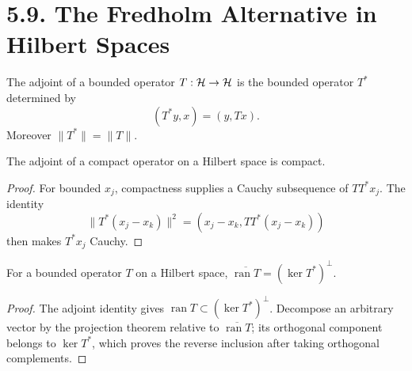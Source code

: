 \section*{5.9. The Fredholm Alternative in Hilbert Spaces}

\begin{definition}\label{gt.def5.9.adjoint-hilbert}

The adjoint of a bounded operator $T:\mathcal{H}\to\mathcal{H}$ is the bounded
operator $T^*$ determined by
\begin{equation}\label{gt.eq5.12}
(T^*y,x)=(y,Tx).
\end{equation}
Moreover $\|T^*\|=\|T\|$.
\end{definition}

\begin{lemma}\label{gt.lem5.9}

The adjoint of a compact operator on a Hilbert space is compact.
\end{lemma}
\begin{proof}
\sketch For bounded $x_j$, compactness supplies a Cauchy subsequence of
$TT^*x_j$. The identity
\[
\|T^*(x_j-x_k)\|^2=(x_j-x_k,TT^*(x_j-x_k))
\]
then makes $T^*x_j$ Cauchy.
\end{proof}

\begin{lemma}\label{gt.lem5.10}

For a bounded operator $T$ on a Hilbert space,
$\overline{\operatorname{ran}T}=(\ker T^*)^\perp$.
\end{lemma}
\begin{proof}

\sketch The adjoint identity gives
$\operatorname{ran}T\subset(\ker T^*)^\perp$. Decompose an arbitrary vector
by the projection theorem relative to $\overline{\operatorname{ran}T}$; its
orthogonal component belongs to $\ker T^*$, which proves the reverse
inclusion after taking orthogonal complements.
\end{proof}

